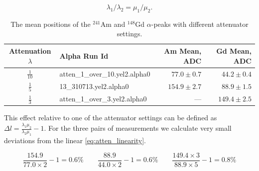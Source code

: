 \documentclass[a4paper,12pt]{article}
\newcommand\americium{${}^{241}$Am}
\newcommand\gadolinium{${}^{148}$Gd}
\begin{document}
\begin{equation}
\lambda_1/\lambda_2 = \mu_1/ \mu_2.
\label{eq:atten_linearity}
\end{equation}


\begin{table}[htb]
\caption{The mean positions of the \americium{} and \gadolinium{} $\alpha$-peaks
with different attenuator settings.}
\centering

\begin{tabular}{clrr}
\toprule
Attenuation $\lambda$ & Alpha Run Id      & Am Mean, ADC      & Gd Mean, ADC \\
\midrule
$\frac{1}{10}$  & \small{atten\_1\_over\_10.yel2.alpha0}  & $77.0\pm0.7$      & $44.2\pm0.4$ \\
\addlinespace
$\frac{1}{5}$   & \small{13\_310713.yel2.alpha0}          & $154.9\pm2.7$     & $88.9\pm1.5$ \\
\addlinespace
$\frac{1}{3}$   & \small{atten\_1\_over\_3.yel2.alpha0}   & ---\hspace{20pt}  & $149.4\pm2.5$ \\
\bottomrule
\end{tabular}

\label{table:atten}
\end{table}

\noindent
This effect relative to one of the attenuator settings can be defined as
$\Delta l = \frac{\lambda_1 \mu_2}{\lambda_2 \mu_1} - 1$. For the three pairs
of measurements we calculate very small deviations from the linear
\cref{eq:atten_linearity}.

\begin{equation}
\frac{154.9}{77.0 \times 2} - 1 = 0.6\%
\qquad
\frac{88.9}{44.0 \times 2} - 1 = 0.6\%
\qquad
\frac{149.4 \times 3}{88.9 \times 5} - 1 = 0.8\%
\end{equation}
\end{document}
